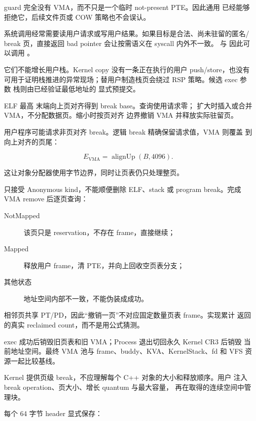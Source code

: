 guard 完全没有 VMA，而不只是一个临时 not-present PTE。因此通用
 已经能够拒绝它，后续文件页或 COW 策略也不会误认。

系统调用经常需要读用户请求或写用户结果。如果目标是合法、尚未驻留的匿名/
break 页，直接返回 bad pointer 会让按需语义在 syscall 内外不一致。
 与  因此可以调用
。

它们不能增长用户栈。Kernel copy 没有一条正在执行的用户 push/store，也没有
可用于证明栈推进的异常现场；替用户制造栈页会绕过 RSP 策略。候选 exec 参数
栈则由已经验证最低地址的  显式预提交。

ELF 最高  末端向上页对齐得到 break base。查询使用请求零；
扩大时插入或合并  VMA，不分配数据页。缩小时按页对齐
边界撤销 VMA 并释放实际驻留页。

用户程序可能请求非页对齐 break。逻辑 break 精确保留请求值，VMA 则覆盖
到向上对齐的页尾：

\[
  E_{\mathrm{VMA}}=\operatorname{alignUp}(B,4096).
\]

这让对象分配器使用字节边界，同时让页表仍只处理整页。

 只接受 Anonymous kind，不能顺便删除 ELF、stack 或
program break。完成 VMA remove 后逐页查询：

\begin{description}
  \item[NotMapped] 该页只是 reservation，不存在 frame，直接继续；
  \item[Mapped] 释放用户 frame，清 PTE，并向上回收空页表分支；
  \item[其他状态] 地址空间内部不一致，不能伪装成成功。
\end{description}

相邻页共享 PT/PD，因此“撤销一页”不对应固定数量页表 frame。实现累计
 返回的真实 reclaimed count，而不是用公式猜测。

exec 成功后销毁旧页表和旧 VMA；Process 退出切回永久 Kernel CR3 后销毁
当前地址空间。最终 VMA 池与 frame、buddy、KVA、KernelStack、fd 和 VFS
资源一起比较基线。

Kernel 提供页级 break，不应理解每个 C++ 对象的大小和释放顺序。用户
 注入 break operation、页大小、增长 quantum 与最大容量，
再在取得的连续空间中管理块。

每个 64 字节 header 显式保存：

